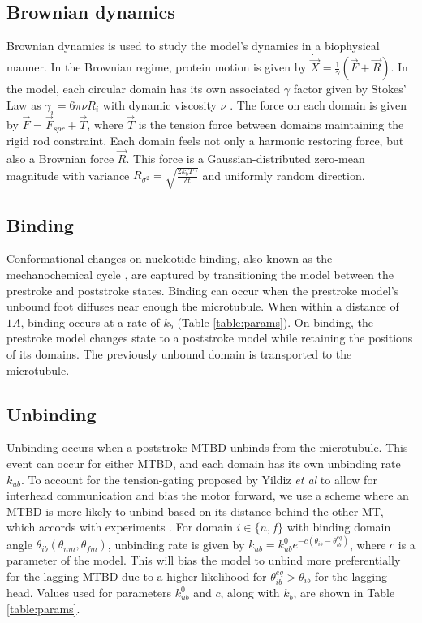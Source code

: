 \documentclass[9pt,twocolumn,twoside]{article}
\begin{document}
\subsection*{Brownian dynamics}
Brownian dynamics is used to study the model's dynamics in a biophysical manner. In the Brownian regime, protein motion is given by $\dot{\vec{X}} = \frac{1}{\gamma}\left(\vec{F}+\vec{R}\right)$. In the model, each circular domain has its own associated $\gamma$ factor given by Stokes' Law as $\gamma_i = 6\pi\nu R_i$ with dynamic viscosity $\nu$ \cite{stokeslaw}. The force on each domain is given by $\vec{F} = \vec{F}_{spr} + \vec{T}$, where $\vec{T}$ is the tension force between domains maintaining the rigid rod constraint. Each domain feels not only a harmonic restoring force, but also a Brownian force $\vec{R}$. This force is a Gaussian-distributed zero-mean magnitude with variance $R_{\sigma^2} = \sqrt{\frac{2k_bT\gamma}{\delta t}}$ and uniformly random direction.

\subsection*{Binding}
Conformational changes on nucleotide binding, also known as the mechanochemical cycle \cite{cianfrocco}, are captured by transitioning the model between the prestroke and poststroke states. Binding can occur when the prestroke model's unbound foot diffuses near enough the microtubule. When within a distance of $1 A$, binding occurs at a rate of $k_b$ (Table \ref{table:params}). On binding, the prestroke model changes state to a poststroke model while retaining the positions of its domains. The previously unbound domain is transported to the microtubule.

\subsection*{Unbinding}
Unbinding occurs when a poststroke MTBD unbinds from the microtubule. This event can occur for either MTBD, and each domain has its own unbinding rate $k_{ub}$. To account for the tension-gating proposed by Yildiz \textit{et al} \cite{yildizcleary} to allow for interhead communication and bias the motor forward, we use a scheme where an MTBD is more likely to unbind based on its distance behind the other MT, which accords with experiments \cite{yildiz}. For domain $i \in \{n, f\}$ with binding domain angle $\theta_{ib}\left(\theta_{nm}, \theta_{fm}\right)$, unbinding rate is given by $k_{ub} = k^0_{ub}e^{-c\left(\theta_{ib}-\theta^{eq}_{ib}\right)}$, where $c$ is a parameter of the model. This will bias the model to unbind more preferentially for the lagging MTBD due to a higher likelihood for $\theta^{eq}_{ib} > \theta_{ib}$ for the lagging head. Values used for parameters $k^0_{ub}$ and $c$, along with $k_b$, are shown in Table \ref{table:params}.
\end{document}

